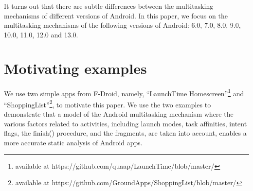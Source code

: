 It turns out that there are subtle differences between the multitasking mechanisms of different versions of Android. In this paper, we focus on the multitasking mechanisms of the following versions of Android: 6.0, 7.0, 8.0, 9.0, 10.0, 11.0, 12.0 and 13.0. 

%

\section{Motivating examples}\label{sec-motiv-exmp}
%
We use two simple apps from F-Droid, namely, ``LaunchTime Homescreen''\footnote{available at https://github.com/quaap/LaunchTime/blob/master/} and ``ShoppingList''\footnote{available at https://github.com/GroundApps/ShoppingList/blob/master/}, to motivate this paper. We use the two examples to demonstrate that a model of the Android multitasking mechanism where the various factors related to activities, including launch modes, task affinities, intent flags, the finish() procedure, and the fragments, are taken into account, enables a more accurate static analysis of Android apps.  
%
